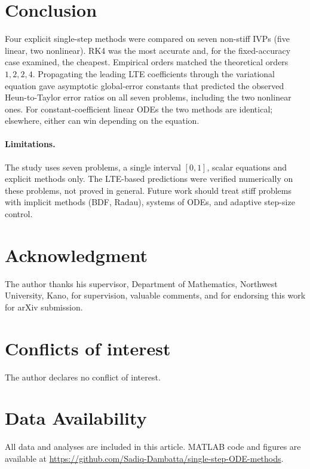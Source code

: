 \documentclass[10pt,letterpaper]{article}
\begin{document}
\section{Conclusion}
Four explicit single-step methods were compared on seven non-stiff IVPs (five linear, two nonlinear). RK4 was the most accurate and, for the fixed-accuracy case examined, the cheapest. Empirical orders matched the theoretical orders $1,2,2,4$. Propagating the leading LTE coefficients through the variational equation gave asymptotic global-error constants that predicted the observed Heun-to-Taylor error ratios on all seven problems, including the two nonlinear ones. For constant-coefficient linear ODEs the two methods are identical; elsewhere, either can win depending on the equation.

\paragraph{Limitations.} The study uses seven problems, a single interval $[0,1]$, scalar equations and explicit methods only. The LTE-based predictions were verified numerically on these problems, not proved in general. Future work should treat stiff problems with implicit methods (BDF, Radau), systems of ODEs, and adaptive step-size control.

\section*{Acknowledgment}
The author thanks his supervisor, Department of Mathematics, Northwest University, Kano, for supervision, valuable comments, and for endorsing this work for arXiv submission.

\section*{Conflicts of interest}
The author declares no conflict of interest.

\section*{Data Availability}
All data and analyses are included in this article. MATLAB code and figures are available at \url{https://github.com/Sadiq-Dambatta/single-step-ODE-methods}.
\end{document}

